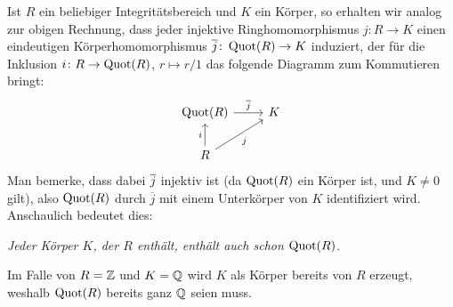 \begin{remark}
  Ist $R$ ein beliebiger Integritätsbereich und $K$ ein Körper, so erhalten wir analog zur obigen Rechnung, dass jeder injektive Ringhomomorphismus $j \colon R \to K$ einen eindeutigen Körperhomomorphismus $\overline{j} \colon \operatorname{Quot}(R) \to K$ induziert, der für die Inklusion $i \colon R \to \operatorname{Quot}(R)$, $r \mapsto r/1$ das folgende Diagramm zum Kommutieren bringt:
  \[
    \begin{tikzcd}
        \Quot{R}
        \arrow{r}{\induced{j}}
      & K
      \\
        R
        \arrow{u}{i}
        \arrow[swap]{ur}{j}
      & {}
    \end{tikzcd}
  \]
  Man bemerke, dass dabei $\overline{j}$ injektiv ist (da $\operatorname{Quot}(R)$ ein Körper ist, und $K \neq 0$ gilt), also $\operatorname{Quot}(R)$ durch $\overline{j}$ mit einem Unterkörper von $K$ identifiziert wird.
  Anschaulich bedeutet dies:
  \begin{center}
    \emph{Jeder Körper $K$, der $R$ enthält, enthält auch schon $\operatorname{Quot}(R)$.}
  \end{center}
  Im Falle von $R = \mathbb{Z}$ und $K = \mathbb{Q}$ wird $K$ als Körper bereits von $R$ erzeugt, weshalb $\operatorname{Quot}(R)$ bereits ganz $\mathbb{Q}$ seien muss.
\end{remark}


